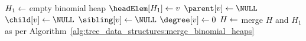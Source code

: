 
\DontPrintSemicolon
\SetAlgoNoLine
\BlankLine
$H_1 \leftarrow$ empty binomial heap\;
$\headElem[H_1] \assign v$\;
$\parent[v] \assign \NULL$\;
$\child[v] \assign \NULL$\;
$\sibling[v] \assign \NULL$\;
$\degree[v] \assign 0$\;
$H \leftarrow$ merge $H$ and $H_1$ as per Algorithm~\ref{alg:tree_data_structures:merge_binomial_heaps}\;
